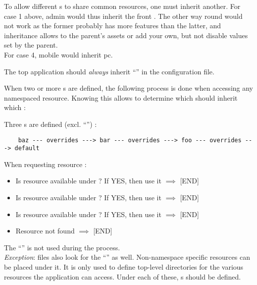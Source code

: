 \documentclass[pdftex,12pt,a4paper]{article}
\begin{document}
To allow different s to share common resources, one must inherit another.
For case 1 above, admin  would thus inherit the front .
The other way round would not work as the former probably has more features than the latter,
and inheritance allows to  the parent's assets or add your own, but not disable values set by the parent.\\
For case 4, mobile would inherit pc.

\begin{note}
The top application  should \emph{always} inherit ``'' in the configuration file.
\end{note}

When two or more s are defined, the following process is done when accessing any namespaced resource.
Knowing this allows to determine which  should inherit which :

Three s are defined (excl. ``'') :
\begin{center}
\begin{unbreakable}
{\scriptsize
\begin{verbatim}
	baz --- overrides ---> bar --- overrides ---> foo --- overrides ---> default
\end{verbatim}
}
\end{unbreakable}
\end{center}

When requesting resource  :
\begin{itemize}
    \item Is  resource available under   ? If YES, then use it $\implies$ [END]
    \item Is  resource available under   ? If YES, then use it $\implies$ [END]
    \item Is  resource available under   ? If YES, then use it $\implies$ [END]
    \item Resource not found $\implies$ [END]
\end{itemize}
\begin{note}
The ``''  is not used during the process.\\
\emph{Exception}:  files also look for the ``''  as well. Non-namespace specific resources can be placed under it.
It is only used to define top-level directories for the various resources the application can access.
Under each of these, s should be defined.
\end{note}
\end{document}
